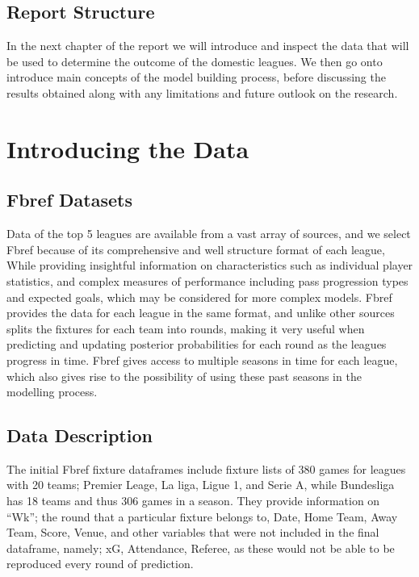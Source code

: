 \documentclass[
]{article}
\begin{document}
\hypertarget{report-structure}{%
\subsection{Report Structure}\label{report-structure}}

In the next chapter of the report we will introduce and inspect the data
that will be used to determine the outcome of the domestic leagues. We
then go onto introduce main concepts of the model building process,
before discussing the results obtained along with any limitations and
future outlook on the research.

\hypertarget{introducing-the-data}{%
\section{Introducing the Data}\label{introducing-the-data}}

\hypertarget{fbref-datasets}{%
\subsection{Fbref Datasets}\label{fbref-datasets}}

Data of the top 5 leagues are available from a vast array of sources,
and we select Fbref because of its comprehensive and well structure
format of each league, While providing insightful information on
characteristics such as individual player statistics, and complex
measures of performance including pass progression types and expected
goals, which may be considered for more complex models. Fbref provides
the data for each league in the same format, and unlike other sources
splits the fixtures for each team into rounds, making it very useful
when predicting and updating posterior probabilities for each round as
the leagues progress in time. Fbref gives access to multiple seasons in
time for each league, which also gives rise to the possibility of using
these past seasons in the modelling process.

\hypertarget{data-description}{%
\subsection{Data Description}\label{data-description}}

The initial Fbref fixture dataframes include fixture lists of 380 games
for leagues with 20 teams; Premier Leage, La liga, Ligue 1, and Serie A,
while Bundesliga has 18 teams and thus 306 games in a season. They
provide information on ``Wk''; the round that a particular fixture
belongs to, Date, Home Team, Away Team, Score, Venue, and other
variables that were not included in the final dataframe, namely; xG,
Attendance, Referee, as these would not be able to be reproduced every
round of prediction.
\end{document}
